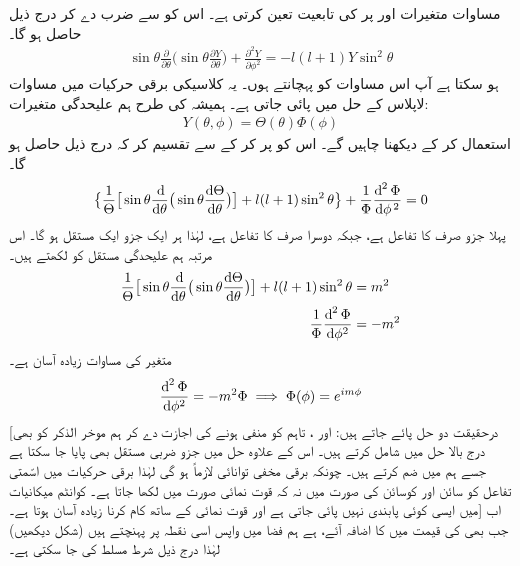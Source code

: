 مساوات  متغیرات     اور      پر   کی تابعیت  تعین کرتی ہے۔
اس کو     سے ضرب دے کر درج ذیل حاصل ہو گا۔
\begin{align}\label{مساوات_ابعادی_زاویائی_مساوات}
\sin{\theta}\frac{\partial}{\partial{\theta}}\big(\sin{\theta}\frac{\partial{Y}}{\partial{\theta}}\big)+\frac{\partial^{2}{Y}}{\partial{\phi^{2}}}=-l(l+1)Y\sin^{2}{\theta} 
\end{align}
ہو سکتا ہے آپ اس مساوات کو پہچانتے ہوں۔ یہ کلاسیکی برقی حرکیات میں مساوات لاپلاس کے حل میں پائی جاتی ہے۔ ہمیشہ کی طرح ہم علیحدگی متغیرات:
\begin{align}
Y(\theta,\phi)=\Theta(\theta)\Phi(\phi) 
\end{align}
استعمال کر کے دیکھنا چاہیں گے۔ اس کو پر کر کے  سے تقسیم کر کہ درج ذیل حاصل ہو گا۔ 
\begin{align*}
\big\{\frac{1}{\Theta}\big[\sin{\theta}\frac{\dif}{\dif\theta}\big(\sin\theta\frac{\dif{\Theta}}{\dif{\theta}}\big)\big]+l(l+1)\sin^{2}{\theta}\big\}+\frac{1}{\Phi}\frac{\dif^{\,2}{\Phi}}{\dif{\phi^{\,2}}}=0 
\end{align*}
پہلا جزو صرف     کا تفاعل ہے، جبکہ دوسرا صرف        کا تفاعل ہے، لہٰذا ہر ایک جزو ایک مستقل ہو گا۔ اس مرتبہ ہم علیحدگی مستقل کو     لکھتے ہیں۔
\begin{align}
\frac{1}{\Theta}\big[\sin{\theta}\frac{\dif}{\dif\theta}\big(\sin\theta\frac{\dif{\Theta}}{\dif{\theta}}\big)\big]+l(l+1)\sin^{2}{\theta}&=m^{2} \\
\frac{1}{\Phi}\frac{\dif^{\,2}{\Phi}}{\dif{\phi^{2}}}&=-m^{2}\label{مساوات_تین_ابعادی_ایم}
\end{align}
 متغیر   کی مساوات زیادہ آسان ہے۔
 \begin{align}
\frac{\dif^{\,2}{\Phi}}{\dif{\phi^{2}}}=-m^{2}\Phi\implies \Phi(\phi)=e^{im\phi} 
\end{align}
[درحقیقت  دو حل پائے جاتے ہیں:  اور ، تاہم  کو منفی ہونے کی اجازت دے کر ہم موخر الذکر کو بھی درج بالا حل میں شامل کرتے ہیں۔ اس کے علاوہ حل میں  جزو ضربی مستقل بھی پایا جا  سکتا ہے جسے ہم     میں ضم کرتے ہیں۔ چونکہ برقی مخفی توانائی لازماً  ہو گی لہٰذا برقی حرکیات میں اسّمتی تفاعل     کو سائن اور کوسائن کی صورت میں نہ کہ قوت نمائی صورت میں لکھا جاتا ہے۔ کوانٹم میکانیات میں ایسی کوئی پابندی نہیں پائی جاتی ہے اور قوت نمائی کے ساتھ کام کرنا زیادہ آسان ہوتا ہے۔] اب جب بھی     کی قیمت  میں   کا اضافہ آئے، ہے ہم فضا میں واپس اسی نقطہ پر پہنچتے ہیں (شکل  دیکھیں) لہٰذا درج ذیل شرط مسلط کی جا سکتی ہے۔
